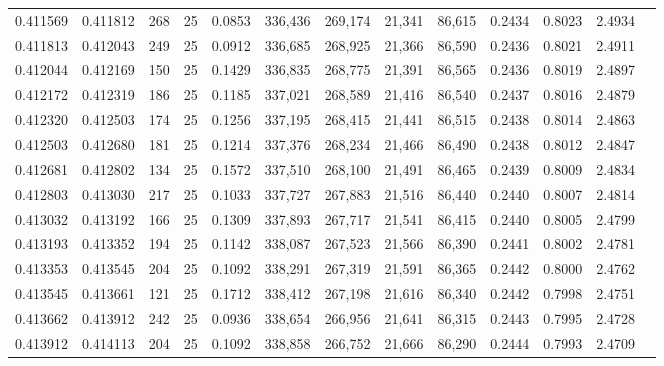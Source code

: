 \begin{tabular}{rrrrrrrrrrrrr}
0.411569 & 0.411812 &   268 &  25 &                                     0.0853 & 336,436 & 269,174 &  21,341 &  86,615 & 0.2434 & 0.8023 & 2.4934 \\
0.411813 & 0.412043 &   249 &  25 &                                     0.0912 & 336,685 & 268,925 &  21,366 &  86,590 & 0.2436 & 0.8021 & 2.4911 \\
0.412044 & 0.412169 &   150 &  25 &                                     0.1429 & 336,835 & 268,775 &  21,391 &  86,565 & 0.2436 & 0.8019 & 2.4897 \\
0.412172 & 0.412319 &   186 &  25 &                                     0.1185 & 337,021 & 268,589 &  21,416 &  86,540 & 0.2437 & 0.8016 & 2.4879 \\
0.412320 & 0.412503 &   174 &  25 &                                     0.1256 & 337,195 & 268,415 &  21,441 &  86,515 & 0.2438 & 0.8014 & 2.4863 \\
0.412503 & 0.412680 &   181 &  25 &                                     0.1214 & 337,376 & 268,234 &  21,466 &  86,490 & 0.2438 & 0.8012 & 2.4847 \\
0.412681 & 0.412802 &   134 &  25 &                                     0.1572 & 337,510 & 268,100 &  21,491 &  86,465 & 0.2439 & 0.8009 & 2.4834 \\
0.412803 & 0.413030 &   217 &  25 &                                     0.1033 & 337,727 & 267,883 &  21,516 &  86,440 & 0.2440 & 0.8007 & 2.4814 \\
0.413032 & 0.413192 &   166 &  25 &                                     0.1309 & 337,893 & 267,717 &  21,541 &  86,415 & 0.2440 & 0.8005 & 2.4799 \\
0.413193 & 0.413352 &   194 &  25 &                                     0.1142 & 338,087 & 267,523 &  21,566 &  86,390 & 0.2441 & 0.8002 & 2.4781 \\
0.413353 & 0.413545 &   204 &  25 &                                     0.1092 & 338,291 & 267,319 &  21,591 &  86,365 & 0.2442 & 0.8000 & 2.4762 \\
0.413545 & 0.413661 &   121 &  25 &                                     0.1712 & 338,412 & 267,198 &  21,616 &  86,340 & 0.2442 & 0.7998 & 2.4751 \\
0.413662 & 0.413912 &   242 &  25 &                                     0.0936 & 338,654 & 266,956 &  21,641 &  86,315 & 0.2443 & 0.7995 & 2.4728 \\
0.413912 & 0.414113 &   204 &  25 &                                     0.1092 & 338,858 & 266,752 &  21,666 &  86,290 & 0.2444 & 0.7993 & 2.4709 \\

\end{tabular}
